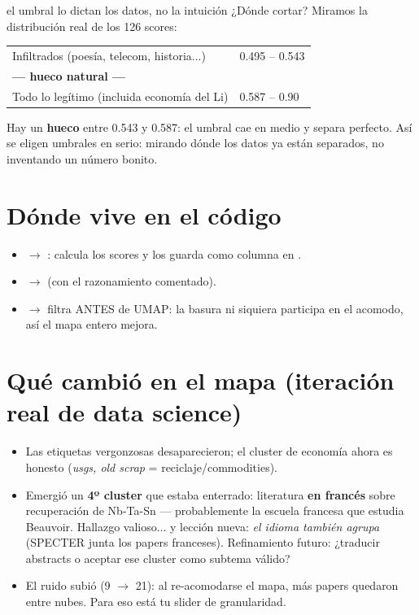 \documentclass[11pt,a4paper]{article}
\begin{document}
\begin{concepto}{el umbral lo dictan los datos, no la intuición}
¿Dónde cortar? Miramos la distribución real de los 126 scores:
\begin{center}
\begin{tabular}{ll}
Infiltrados (poesía, telecom, historia...) & 0.495 -- 0.543 \\
\textbf{--- hueco natural ---} & \\
Todo lo legítimo (incluida economía del Li) & 0.587 -- 0.90 \\
\end{tabular}
\end{center}
Hay un \textbf{hueco} entre 0.543 y 0.587: el umbral 
cae en medio y separa perfecto. Así se eligen umbrales en serio: mirando dónde los datos ya
están separados, no inventando un número bonito.
\end{concepto}

\section{Dónde vive en el código}

\begin{itemize}
  \item {} $\rightarrow$ : calcula los scores y
        los guarda como columna  en .
  \item {} $\rightarrow$  (con el
        razonamiento comentado).
  \item {} $\rightarrow$ filtra ANTES de UMAP: la basura ni siquiera
        participa en el acomodo, así el mapa entero mejora.
\end{itemize}

\section{Qué cambió en el mapa (iteración real de data science)}

\begin{itemize}
  \item Las etiquetas vergonzosas desaparecieron; el cluster de economía ahora es honesto
        (\emph{usgs, old scrap} = reciclaje/commodities).
  \item Emergió un \textbf{4º cluster} que estaba enterrado: literatura \textbf{en francés}
        sobre recuperación de Nb-Ta-Sn --- probablemente la escuela francesa que estudia
        Beauvoir. Hallazgo valioso... y lección nueva: \emph{el idioma también agrupa}
        (SPECTER junta los papers franceses). Refinamiento futuro: ¿traducir abstracts o
        aceptar ese cluster como subtema válido?
  \item El ruido subió (9 $\rightarrow$ 21): al re-acomodarse el mapa, más papers quedaron
        entre nubes. Para eso está tu slider de granularidad.
\end{itemize}
\end{document}
